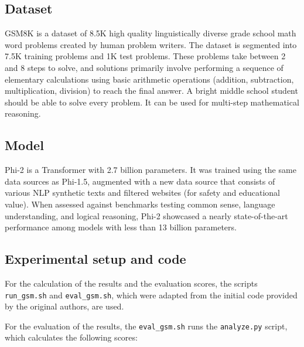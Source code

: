 \documentclass[10pt]{article} %
\begin{document}
\subsection{Dataset}

GSM8K is a dataset of 8.5K high quality linguistically diverse grade school math word problems created by human problem writers. The dataset is segmented into 7.5K training problems and 1K test problems. These problems take between 2 and 8 steps to solve, and solutions primarily involve performing a sequence of elementary calculations using basic arithmetic operations (addition, subtraction, multiplication, division)  to reach the final answer. A bright middle school student should be able to solve every problem. It can be used for multi-step mathematical reasoning.

\subsection{Model}

Phi-2 \citep{microsoft2023phi2} is a Transformer with 2.7 billion parameters. It was trained using the same data sources as Phi-1.5, augmented with a new data source that consists of various NLP synthetic texts and filtered websites (for safety and educational value). When assessed against benchmarks testing common sense, language understanding, and logical reasoning, Phi-2 showcased a nearly state-of-the-art performance among models with less than 13 billion parameters.

\subsection{Experimental setup and code}
\label{metrics}
For the calculation of the results and the evaluation scores, the scripts \texttt{run\_gsm.sh} and \texttt{eval\_gsm.sh}, which were adapted from the initial code provided by the original authors, are used.

For the evaluation of the results, the \texttt{eval\_gsm.sh} runs the \texttt{analyze.py} script, which calculates the following scores:
\end{document}
